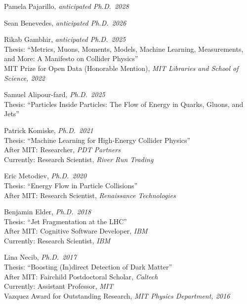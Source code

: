 \bbl

\item Pamela Pajarillo, \emph{anticipated Ph.D.~2028}

\item Sean Benevedes, \emph{anticipated Ph.D.~2026}

\item Rikab Gambhir, \emph{anticipated Ph.D.~2025}
\\ Thesis: ``Metrics, Muons, Moments, Models, Machine Learning, Measurements, and More: A Manifesto on Collider Physics''
\\ MIT Prize for Open Data (Honorable Mention), \emph{MIT Libraries and School of Science, 2022}

\item Samuel Alipour-fard, \emph{Ph.D.~2025}
\\ Thesis: ``Particles Inside Particles: The Flow of Energy in Quarks, Gluons, and Jets''

\item Patrick Komiske, \emph{Ph.D.~2021}
\\ Thesis: ``Machine Learning for High-Energy Collider Physics''
\\ After MIT: Researcher, \emph{PDT Partners}
\\ Currently: Research Scientist, \emph{River Run Trading}

\item Eric Metodiev, \emph{Ph.D.~2020}
\\ Thesis: ``Energy Flow in Particle Collisions''
\\ After MIT: Research Scientist, \emph{Renaissance Technologies}

\item Benjamin Elder, \emph{Ph.D.~2018}
\\ Thesis: ``Jet Fragmentation at the LHC''
\\ After MIT: Cognitive Software Developer, \emph{IBM}
\\ Currently: Research Scientist, \emph{IBM}

\item Lina Necib, \emph{Ph.D.~2017}
\\ Thesis: ``Boosting (In)direct Detection of Dark Matter''
\\ After MIT: Fairchild Postdoctoral Scholar, \emph{Caltech}
\\ Currently: Assistant Professor, \emph{MIT}
\\ Vazquez Award for Outstanding Research, \emph{MIT Physics Department, 2016}

